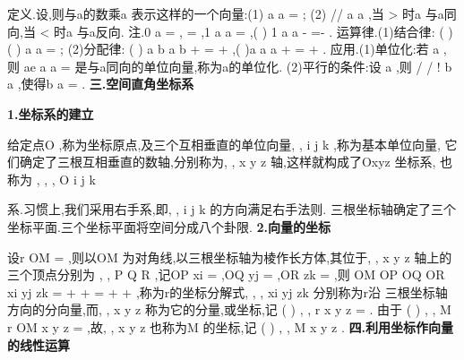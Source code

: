 \textcolor{lyred}{定义}.设\lambda \in {},则\lambda 与a\rho 的\textcolor{lyred}{数乘}a
\lambda \rho 表示这样的一个向量:(1)
a
a
\lambda 
\lambda 
=
\rho 
\rho ; 
(2)
//
a
a
\lambda \rho 
\rho ,当
\lambda >
时a
\lambda \rho 与a\rho 同向,当
\lambda <
时a
\lambda \rho 与a\rho 反向. 
\textcolor{lyred}{注}.0
a
\cdots 
=
\rho 
\rho 
,
\lambda \cdots 
=
\rho 
\rho 
,1 a
a
\cdots 
=
\rho 
\rho ,(
)
1 a
a
-
\cdots 
=-
\rho 
\rho . 
\textcolor{lyred}{运算律}.(1)\textcolor{lyred}{结合律}: (
)
(
)
a
a
\lambda \mu 
\lambda \mu 
=
\rho 
\rho ; 
(2)\textcolor{lyred}{分配律}: (
)
a
b
a
b
\lambda 
\lambda 
\lambda 
+
=
+
\rho 
\rho 
\rho 
\rho 
,(
)a
a
a
\lambda 
\mu 
\lambda 
\mu 
+
=
+
\rho 
\rho 
\rho . 
\textcolor{lyred}{应用}.(1)\textcolor{lyred}{单位化}:若
a \neq 
\rho 
\rho 
,则
ae
a
a
=
\rho 
\rho 
\rho 
是与a\rho 同向的单位向量,称为a\rho 的\textcolor{lyred}{单位化}. 
(2)\textcolor{lyred}{平行的条件}:设
a \neq 
\rho 
\rho 
,则
/ /
!
b
a
\lambda 
\Leftrightarrow \exists 
\in 
\rho 
\rho 
{},使得b
a
\lambda 
=
\rho 
\rho . 
\vspace{4pt}
{\bfseries \textcolor{lyred}{三.空间直角坐标系}}

{\bfseries \textcolor{lyred}{1.坐标系的建立}}

给定点O ,称为\textcolor{lyred}{坐标原点},及三个互相垂直的单位向量, ,
i j k
\rho 
\rho \rho 
,称为\textcolor{lyred}{基本单位向量}, 
它们确定了三根互相垂直的数轴,分别称为, ,
x y z\textcolor{lyred}{ 轴},这样就构成了Oxyz\textcolor{lyred}{ 坐标系}, 
也称为
, , ,
O i j k




\rho 
\rho \rho 
\textcolor{lyred}{系}.习惯上,我们采用\textcolor{lyred}{右手系},即, ,
i j k
\rho 
\rho \rho 
的方向满足\textcolor{lyred}{右手法则}. 
三根坐标轴确定了三个\textcolor{lyred}{坐标平面}.三个坐标平面将空间分成八个\textcolor{lyred}{卦限}. 
{\bfseries \textcolor{lyred}{2.向量的坐标}}

设r
OM
=
\xi \xi \xi \xi \rho 
\rho 
,则以OM 为对角线,以三根坐标轴为棱作长方体,其位于, ,
x y z 轴上的 
三个顶点分别为
,
,
P Q R ,记OP
xi
=
\xi \xi \xi \rho 
\rho ,OQ
yj
=
\xi \xi \xi \rho 
\rho 
,OR
zk
=
\xi \xi \xi \rho 
\rho 
,则 
OM
OP
OQ
OR
xi
yj
zk
=
+
+
=
+
+
\xi \xi \xi \xi \rho 
\xi \xi \xi \rho 
\xi \xi \xi \rho 
\xi \xi \xi \rho 
\rho 
\rho 
\rho 
,称为r\rho 的\textcolor{lyred}{坐标分解式},
,
,
xi yj zk
\rho 
\rho 
\rho 
分别称为r\rho 沿 
三根坐标轴方向的\textcolor{lyred}{分向量},而, ,
x y z 称为它的\textcolor{lyred}{分量},或\textcolor{lyred}{坐标},记
(
)
, ,
r
x y z
=
\rho 
. 
由于
(
)
, ,
M
r
OM
x y z
\leftrightarrow 
=
\leftrightarrow 
\xi \xi \xi \xi \rho 
\rho 
,故, ,
x y z 也称为M 的\textcolor{lyred}{坐标},记
(
)
, ,
M x y z . 
\vspace{4pt}
{\bfseries \textcolor{lyred}{四.利用坐标作向量的线性运算}}

